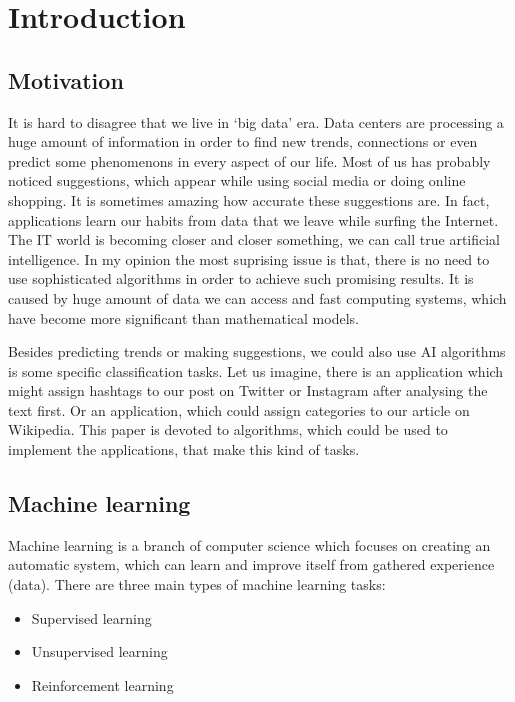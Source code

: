 
\chapter{Introduction}

\section{Motivation}

It is hard to disagree that we live in `big data' era. Data centers are processing a huge amount of information in order to find new trends, connections or even predict some phenomenons in every aspect of our life. Most of us has probably noticed suggestions, which appear while using social media or doing online shopping. It is sometimes amazing how accurate these suggestions are. In fact, applications learn our habits from data that we leave while surfing the Internet. The IT world is becoming closer and closer something, we can call true artificial intelligence. In my opinion the most suprising issue is that, there is no need to use sophisticated algorithms in order to achieve such promising results. It is caused by huge amount of data we can access and fast computing systems, which have become more significant than mathematical models.  

Besides predicting trends or making suggestions, we could also use AI algorithms is some specific classification tasks. Let us imagine, there is an application which might assign hashtags to our post on Twitter or Instagram after analysing the text first. Or an application, which could assign categories to our article on Wikipedia. This paper is devoted to algorithms, which could be used to implement the applications, that make this kind of tasks. 

\section{Machine learning}

Machine learning is a branch of computer science which focuses on creating an automatic system, which can learn and improve itself from gathered experience (data). There are three main types of machine learning tasks:

\begin{itemize}
\item Supervised learning
\item Unsupervised learning
\item Reinforcement learning
\end{itemize}

